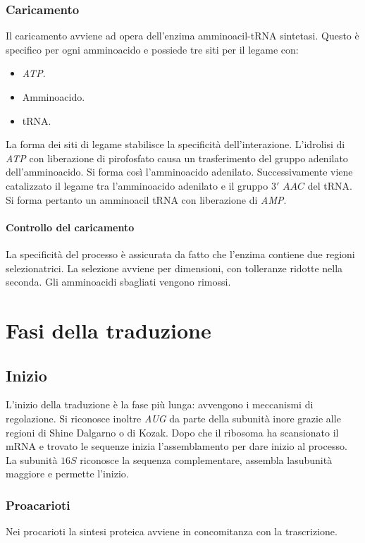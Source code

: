 		\subsubsection{Caricamento}
		Il caricamento avviene ad opera dell'enzima amminoacil-tRNA sintetasi.
		Questo \`e specifico per ogni amminoacido e possiede tre siti per il legame con:
		\begin{multicols}{3}
			\begin{itemize}
				\item \emph{ATP}.
				\item Amminoacido.
				\item tRNA.
			\end{itemize}
		\end{multicols}
		La forma dei siti di legame stabilisce la specificit\`a dell'interazione.
		L'idrolisi di \emph{ATP} con liberazione di pirofosfato causa un trasferimento del gruppo adenilato dell'amminoacido.
		Si forma cos\`i l'amminoacido adenilato.
		Successivamente viene catalizzato il legame tra l'amminoacido adenilato e il gruppo $3'$ $AAC$ del tRNA.
		Si forma pertanto un amminoacil tRNA con liberazione di \emph{AMP}.

			\paragraph{Controllo del caricamento}
			La specificit\`a del processo \`e assicurata da fatto che l'enzima contiene due regioni selezionatrici.
			La selezione avviene per dimensioni, con tolleranze ridotte nella seconda.
			Gli amminoacidi sbagliati vengono rimossi.

\section{Fasi della traduzione}

	\subsection{Inizio}
	L'inizio della traduzione \`e la fase pi\`u lunga: avvengono i meccanismi di regolazione.
	Si riconosce inoltre \emph{AUG} da parte della subunit\`a inore grazie alle regioni di Shine Dalgarno o di Kozak.
	Dopo che il ribosoma ha scansionato il mRNA e trovato le sequenze inizia l'assemblamento per dare inizio al processo.
	La subunit\`a $16S$ riconosce la sequenza complementare, assembla lasubunit\`a maggiore e permette l'inizio.

		\subsubsection{Proacarioti}
		Nei procarioti la sintesi proteica avviene in concomitanza con la trascrizione.

